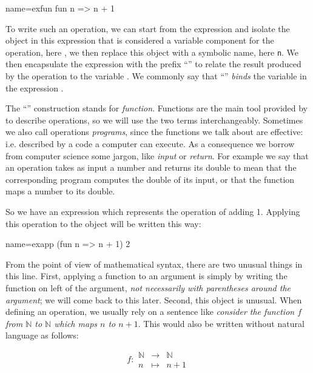 \begin{coq}{name=exfun}{}
  fun n => n + 1
\end{coq}
To write such an operation, we can start from the expression 
and isolate the object in this expression that is considered a
variable component for the operation, here , we then replace
this object with a symbolic name, here {\tt n}.  We then encapsulate
the expression  with the prefix ``'' to relate
the result produced by the operation to the variable .  We commonly
say that ``'' \emph{binds} the variable  in the expression
.

The ``'' construction stands for \emph{function}.  Functions are the
main tool provided by \Coq{} to describe operations, so we will use the
two terms interchangeably.  Sometimes we also call operations \emph{programs},
since the functions we talk about are effective: i.e. described by a code
a computer can execute.  As a consequence we borrow from computer science
some jargon, like \emph{input} or \emph{return}. For example we say that
an operation takes as input a number and returns its double to mean
that the corresponding program computes the double of its input, or
that the function maps a number to its double.

So we have an expression which represents the operation of adding 1.
Applying this operation to the object  will be written this
way:

\begin{coq}{name=exapp}{}
  (fun n => n + 1) 2
\end{coq}
From the point of view of mathematical syntax, there are two unusual 
things in this line.  First, applying a function to an argument is simply
by writing the function on left of the argument, {\em not necessarily
with parentheses around the argument}; we will come back to this later.
Second, this object  is unusual.  
When defining an operation, we usually
rely on a sentence like {\em consider the function \(f\) from {\(\mathbb{N}\)}
to {\(\mathbb{N}\)} which maps \(n\) to \(n + 1\)}.  This would also be
written without natural language as follows:

\begin{equation}\label{equation:f}
f : 
\begin{array}{ccc}
{\mathbb{N}} &\rightarrow& {\mathbb{N}}\\
n &\mapsto& n + 1
\end{array}
\end{equation}

